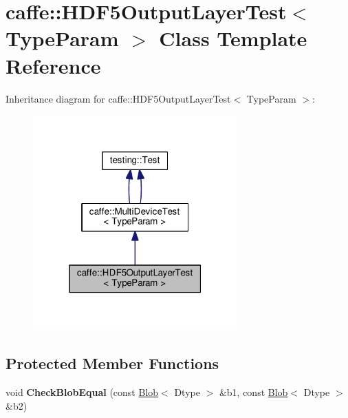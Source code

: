 \hypertarget{classcaffe_1_1_h_d_f5_output_layer_test}{}\section{caffe\+:\+:H\+D\+F5\+Output\+Layer\+Test$<$ Type\+Param $>$ Class Template Reference}
\label{classcaffe_1_1_h_d_f5_output_layer_test}


Inheritance diagram for caffe\+:\+:H\+D\+F5\+Output\+Layer\+Test$<$ Type\+Param $>$\+:
\nopagebreak
\begin{figure}[H]
\begin{center}
\leavevmode
\includegraphics[width=223pt]{classcaffe_1_1_h_d_f5_output_layer_test__inherit__graph}
\end{center}
\end{figure}
\subsection*{Protected Member Functions}
\begin{DoxyCompactItemize}
\item 
\mbox{\label{classcaffe_1_1_h_d_f5_output_layer_test_a43fc87420216e0a642dd944188ec31b5}} 
void {\bfseries Check\+Blob\+Equal} (const \mbox{\hyperlink{classcaffe_1_1_blob}{Blob}}$<$ Dtype $>$ \&b1, const \mbox{\hyperlink{classcaffe_1_1_blob}{Blob}}$<$ Dtype $>$ \&b2)
\end{DoxyCompactItemize}
